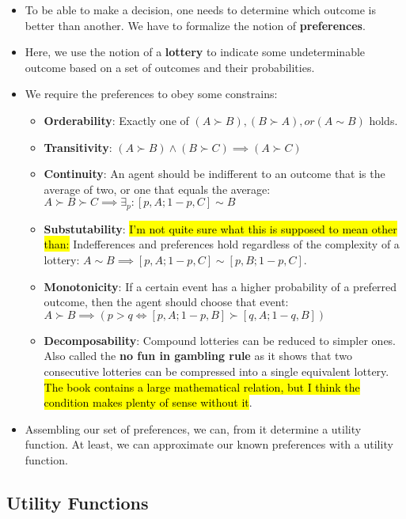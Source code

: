 \documentclass[
]{book}
\begin{document}
\begin{itemize}
\item
  To be able to make a decision, one needs to determine which outcome is
  better than another. We have to formalize the notion of
  \textbf{preferences}.
\item
  Here, we use the notion of a \textbf{lottery} to indicate some
  undeterminable outcome based on a set of outcomes and their
  probabilities.
\item
  We require the preferences to obey some constrains:

  \begin{itemize}
  \item
    \textbf{Orderability}: Exactly one of
    \((A \succ B), (B \succ A), or (A \sim B)\) holds.
  \item
    \textbf{Transitivity}:
    \((A \succ B) \land (B \succ C) \implies (A \succ C)\)
  \item
    \textbf{Continuity}: An agent should be indifferent to an outcome
    that is the average of two, or one that equals the average:
    \(A \succ B \succ C \implies \exists_p : [p, A; 1-p, C] \sim B\)
  \item
    \textbf{Substutability}: \hl{I'm not quite sure what this is
    supposed to mean other than:} Indefferences and preferences hold
    regardless of the complexity of a lottery:
    \(A \sim B \implies [p, A; 1-p, C] \sim [p, B; 1-p, C]\).
  \item
    \textbf{Monotonicity}: If a certain event has a higher probability
    of a preferred outcome, then the agent should choose that event:
    \(A \succ B \implies (p > q \iff [p, A; 1-p, B] \succ [q, A; 1-q, B])\)
  \item
    \textbf{Decomposability}: Compound lotteries can be reduced to
    simpler ones. Also called the \textbf{no fun in gambling rule} as it
    shows that two consecutive lotteries can be compressed into a single
    equivalent lottery. \hl{The book contains a large mathematical
    relation, but I think the condition makes plenty of sense without
    it}.
  \end{itemize}
\item
  Assembling our set of preferences, we can, from it determine a utility
  function. At least, we can approximate our known preferences with a
  utility function.
\end{itemize}

\hypertarget{utility-functions}{%
\subsection{Utility Functions}\label{utility-functions}}
\end{document}
